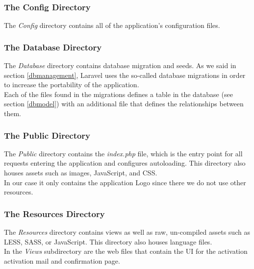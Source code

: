 \subsubsection*{The Config Directory}
The \textit{Config} directory contains all of the application's configuration files.

\subsubsection*{The Database Directory}
The \textit{Database} directory contains database migration and seeds. As we said in section \ref{dbmanagement}, Laravel uses the so-called database migrations in order to increase the portability of the application.\\
Each of the files found in the migrations defines a table in the database (see section \ref{dbmodel}) with an additional file that defines the relationships between them. 

\subsubsection*{The Public Directory}
The \textit{Public} directory contains the \textit{index.php} file, which is the entry point for all requests entering the application and configures autoloading. This directory also houses assets such as images, JavaScript, and CSS.\\
In our case it only contains the application Logo since there we do not use other resources.

\subsubsection*{The Resources Directory}
The \textit{Resources} directory contains views as well as raw, un-compiled assets such as LESS, SASS, or JavaScript. This directory also houses language files.\\
In the \textit{Views} subdirectory are the web files that contain the UI for the activation activation mail and confirmation page.

